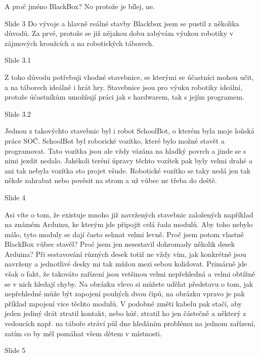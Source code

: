 A proč jméno BlackBox? No protože je bílej, ne. %


Slide 3 
Do vývoje a hlavně reálné stavby Blackbox jsem se pustil z několika důvodů. Za prvé, protože se již nějakou dobu zabývám 
výukou robotiky v zájmových kroužcích a na robotických táborech. 

    Slide 3.1

    Z toho důvodu potřebuji 
    vhodné stavebnice, se kterými se účastníci mohou učit, a na táborech ideálně i hrát hry.
    Stavebnice jsou pro výuku robotiky ideální, protože účastníkům umožňují práci jak 
    s hardwarem, tak s jejím programem. %

    Slide 3.2

    Jednou z takovýchto stavebnic byl i robot SchoolBot, o kterém byla moje loňská práce SOČ.
    SchoolBot byl roborické vozítko, které bylo možné stavět a programovat.  
    Tato vozítka jsou ale vždy vázána na hladký povrch a jinde se s nimi jezdit nedalo.
    Jakékoli teréní úpravy těchto vozítek pak byly velmi drahé a ani tak nebyla vozítka sto projet všude.
    Robotické vozítko se taky nedá jen tak někde zahrabat nebo pověsit na strom a už vůbec ne třeba do deště. 


Slide 4

Asi víte o tom, že existuje mnoho již navržených stavebnic založených například na známém Arduinu, 
ke kterým jde připojit celá řada modulů. Aby toho nebylo málo, tyto moduly se dají často sehnat velmi levně. 
Proč jsem potom vlastně BlackBox vůbec stavěl? Proč jsem jen nesestavil dohromady několik desek Arduina? 
Při sestavování různých desek
totiž ne vždy vím, jak konkrétně jsou navrženy a jednotlivé desky mi tak můžou mezi sebou kolidovat.
Primárně jde však o fakt, že takováto zařízení jsou vetšinou velmi nepřehledná a velmi obtížně se v nich hledají chyby. 
Na obrázku vlevo si můžete udělat představu o tom, jak nepřehledné může být zapojení pouhých dvou čipů, 
na obrázku vpravo je pak příklad zapojení vice těchto modulů. V podobné změti kabelu pak stačí, aby jeden jediný drát 
ztratil kontakt, nebo hůř, ztratil ho jen částečně a některý z vedoucích např. na táboře stráví půl dne hledáním problému 
na jednom zařízení, zatím co by měl pomáhat všem dětem v místnosti.


Slide 5

